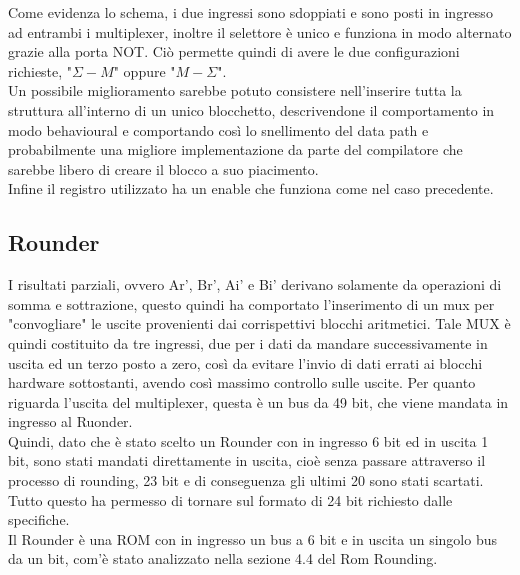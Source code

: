 \documentclass[a4paper, titlepage]{article}
\begin{document}
Come evidenza lo schema, i due ingressi sono sdoppiati e sono posti in ingresso ad entrambi i multiplexer, inoltre il selettore è unico e funziona in modo alternato grazie alla porta NOT. Ciò permette quindi di avere le due configurazioni richieste, "$\Sigma - M$" oppure "$M-\Sigma$".\\Un possibile miglioramento sarebbe potuto consistere nell'inserire tutta la struttura all'interno di un unico blocchetto, descrivendone il comportamento in modo behavioural e comportando così lo snellimento del data path e probabilmente una migliore implementazione da parte del compilatore che sarebbe libero di creare il blocco a suo piacimento.\\Infine il registro utilizzato ha un enable che funziona come nel caso precedente.
\subsection{Rounder}%
I risultati parziali, ovvero Ar', Br', Ai' e Bi' derivano solamente da operazioni di somma e sottrazione, questo quindi ha comportato l'inserimento di un mux per "convogliare" le uscite provenienti dai corrispettivi blocchi aritmetici. %
Tale MUX è quindi costituito da tre ingressi, due per i dati da mandare successivamente in uscita ed un terzo posto a zero, così da evitare l'invio di dati errati ai blocchi hardware sottostanti, avendo così massimo controllo sulle uscite. Per quanto riguarda l'uscita del multiplexer, questa è un bus da 49 bit, che viene mandata in ingresso al Ruonder.\\ %
Quindi, dato che è stato scelto un Rounder con in ingresso 6 bit ed in uscita 1 bit, sono stati mandati direttamente in uscita, cioè senza passare attraverso il processo di rounding, 23 bit e di conseguenza gli ultimi 20 sono stati scartati. Tutto questo ha permesso di tornare sul formato di 24 bit richiesto dalle specifiche.\\
Il Rounder è una ROM con in ingresso un bus a 6 bit e in uscita un singolo bus da un bit, com'è stato analizzato nella sezione 4.4 del Rom Rounding.
\end{document}
